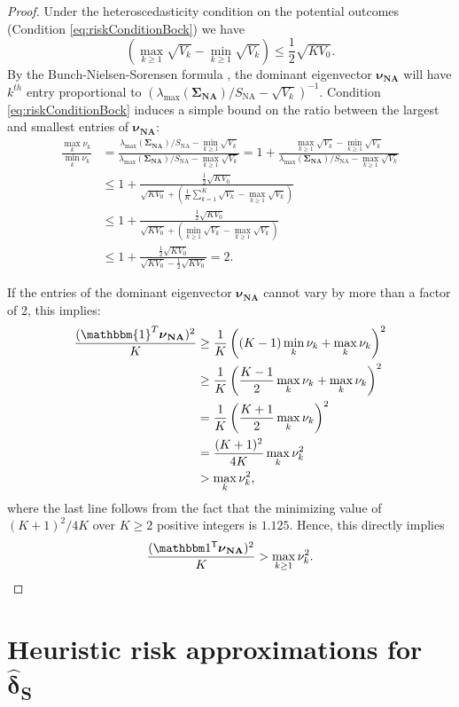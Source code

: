 \documentclass{article}
\newcommand{\bsSigmaN}{\boldsymbol {\Sigma_{\textbf{NA}}}}
\newcommand{\bsnu}{\boldsymbol \nu_{\textbf{NA}}}
\newcommand{\bsdelts}{\boldsymbol {\hat \delta_S}}
\newcommand{\tran}{\mathsf{T}}
\newcommand{\lambdamaxn}{\lambda_{\text{max}}(\bsSigmaN)}
\newcommand{\sna}{S_{\text{NA}}}
\begin{document}
\begin{proof}

Under the heteroscedasticity condition on the potential outcomes (Condition \ref{eq:riskConditionBock}) we have
\[ \left( \max_{k \geq 1}\sqrt{V_k}-\min_{k \geq 1}\sqrt{V_k} \right) \leq \frac{1}{2} \sqrt{K V_0}. \]
By the Bunch-Nielsen-Sorensen formula \citep{bunch1978rank}, the dominant eigenvector $\bsnu$ will have $k^{th}$ entry proportional to $\left(\lambdamaxn/\sna-\sqrt{V_k}\right)^{-1}$. Condition \ref{eq:riskConditionBock} induces a simple bound on the ratio between the largest and smallest entries of $\bsnu$:
\begin{align*}
\frac{\max_k \nu_k}{\min_k \nu_k} &= \frac{\lambdamaxn/\sna - \min_{k \geq 1} \sqrt{V_k}}{\lambdamaxn/\sna - \max_{k \geq 1} \sqrt{V_k}} = 1 + \frac{\max_{k \geq 1} \sqrt{V_k} - \min_{k \geq 1} \sqrt{V_k}}{\lambdamaxn/\sna - \max_{k \geq 1} \sqrt{V_k}} \\
& \leq 1 + \frac{\frac{1}{2} \sqrt{K V_0}}{\sqrt{K V_0} + \left( \frac{1}{K} \sum_{k = 1}^K \sqrt{V_k} - \max_{k \geq 1 } \sqrt{V_k}\right)} \\
& \leq 1 + \frac{\frac{1}{2} \sqrt{K V_0}}{\sqrt{K V_0} + \left( \min_{k \geq 1} \sqrt{V_k} - \max_{k \geq 1 } \sqrt{V_k}\right)} \\
& \leq 1 + \frac{\frac{1}{2} \sqrt{K V_0}}{\sqrt{KV_0} - \frac{1}{2} \sqrt{K V_0}} = 2.
\end{align*}

If the entries of the dominant eigenvector $\bsnu$ cannot vary by more than a factor of 2, this implies:
\begin{align*}
 \frac{(\mathbbm{1}^T \bsnu)^2}{K} &\geq \frac{1}{K} \left((K - 1) \min_k \nu_k + \max_k \nu_k \right)^2 \\
 &\geq \frac{1}{K} \left(\frac{K - 1}{2} \max_k \nu_k + \max_k \nu_k \right)^2 \\
 &= \frac{1}{K} \left(\frac{K + 1}{2} \max_k \nu_k \right)^2 \\
 &= \frac{(K + 1)^2}{4K} \max_k \nu_k^2\\
 & > \max_k \nu_k^2,
\end{align*}
where the last line follows from the fact that the minimizing value of $(K + 1)^2/4K$ over $K \geq 2$ positive integers is $1.125$. Hence, this directly implies
\[ \frac{(\mathbbm 1^\tran\bsnu)^2}{K}>\max_{k\geq1}\nu_k^2. \]
\end{proof}

\section{Heuristic risk approximations for $\bsdelts$}\label{sec:riskApprox}
\end{document}
